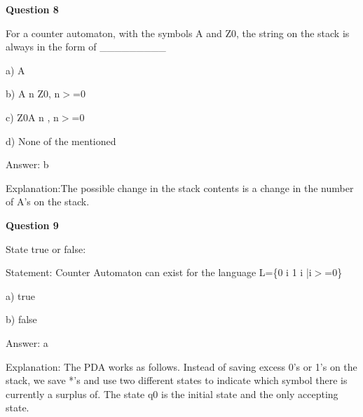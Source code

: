 \documentclass{article}
\begin{document}
\begin{mdframed}[linewidth=1pt, roundcorner=5pt, linecolor=gray!30, backgroundcolor=gray!5]
\textbf{Question 8} 

For a counter automaton, with the symbols A and Z0, the string on the stack is always in the form of \_\_\_\_\_\_\_\_\_

a) A

b) A
n
Z0, n$>$=0

c) Z0A
n
, n$>$=0

d) None of the mentioned
\vspace{5pt} \par
\begin{tcolorbox}[colback=green!5, colframe=green!40!black, title=Solution]
Answer: b

Explanation:The possible change in the stack contents is a change in the number of A's on the stack.
\end{tcolorbox}
\end{mdframed}

\begin{mdframed}[linewidth=1pt, roundcorner=5pt, linecolor=gray!30, backgroundcolor=gray!5]
\textbf{Question 9} 

State true or false:

Statement: Counter Automaton can exist for the language L=\{0
i
1
i
|i$>$=0\}

a) true

b) false
\vspace{5pt} \par
\begin{tcolorbox}[colback=green!5, colframe=green!40!black, title=Solution]
Answer: a

Explanation: The PDA works as follows. Instead of saving excess 0's or 1's on the stack, we save *'s and use two different states to indicate which symbol there is currently a surplus of. The state q0 is the initial state and the only accepting state.
\end{tcolorbox}
\end{mdframed}
\newpage
\end{document}
